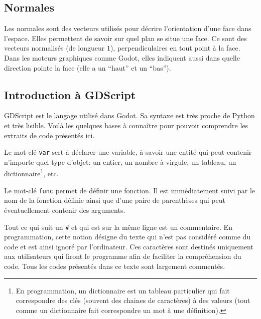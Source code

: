 \subsection{Normales}
\label{sec:normales}
Les normales sont des vecteurs utilisés pour décrire l'orientation d'une face dans l'espace. Elles permettent de savoir sur quel plan se situe une face. Ce sont des vecteurs normalisés (de longueur $1$), perpendiculaires en tout point à la face. Dans les moteurs graphiques comme Godot, elles indiquent aussi dans quelle direction pointe la face (elle a un \enquote{haut} et un \enquote{bas}).


\newpage
\subsection{Introduction à GDScript}

GDScript est le langage utilisé dans Godot. Sa syntaxe est très proche de Python et très lisible. Voilà les quelques bases à connaître pour pouvoir comprendre les extraits de code présentés ici.\cite{godotenginegodot_}

Le mot-clé \lstinline|var| sert à déclarer une variable, à savoir une entité qui peut contenir n'importe quel type d'objet: un entier, un nombre à virgule, un tableau, un dictionnaire\footnote{En programmation, un dictionnaire est un tableau particulier qui fait correspondre des clés (souvent des chaines de caractères) à des valeurs (tout comme un dictionnaire fait correspondre un mot à une définition).}, etc.

Le mot-clé \lstinline|func| permet de définir une fonction. Il est immédiatement suivi par le nom de la fonction définie ainsi que d'une paire de parenthèses qui peut éventuellement contenir des arguments.

Tout ce qui suit un \lstinline|#| et qui est sur la même ligne est un commentaire. En programmation, cette notion désigne du texte qui n'est pas considéré comme du code et est ainsi ignoré par l'ordinateur. Ces caractères sont destinés uniquement aux utilisateurs qui liront le programme afin de faciliter la compréhension du code. Tous les codes présentés dans ce texte sont largement commentés.

